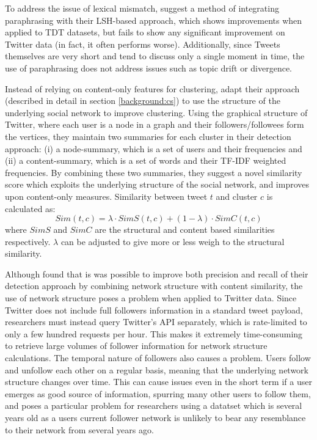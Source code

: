 To address the issue of lexical mismatch, \cite{Petrovic:2012:UPI:2382029.2382072} suggest a method of integrating paraphrasing with their LSH-based approach, which shows improvements when applied to TDT datasets, but fails to show any significant improvement on Twitter data (in fact, it often performs worse).
Additionally, since Tweets themselves are very short and tend to discuss only a single moment in time, the use of paraphrasing does not address issues such as topic drift or divergence.

Instead of relying on content-only features for clustering, \cite{Aggarwal12} adapt their approach (described in detail in section \ref{background:cs}) to use the structure of the underlying social network to improve clustering.
Using the graphical structure of Twitter, where each user is a node in a graph and their followers/followees form the vertices, they maintain two summaries
for each cluster in their detection approach: (i) a node-summary, which is a set of users and their frequencies and (ii) a content-summary, which is a set of words and their TF-IDF \citep{Salton:1988:TAA:54259.54260} weighted frequencies.
By combining these two summaries, they suggest a novel similarity score which exploits the underlying structure of the social network, and improves upon content-only measures.
Similarity between tweet $t$ and cluster $c$ is calculated as:
\begin{displaymath}
	Sim(t, c) = \lambda \cdot SimS(t, c) + (1 - \lambda) \cdot SimC(t, c)
\end{displaymath}
where $SimS$ and $SimC$ are the structural and content based similarities respectively.
$\lambda$ can be adjusted to give more or less weigh to the structural similarity.

Although \cite{Aggarwal12} found that is was possible to improve both precision and recall of their detection approach by combining network structure with content similarity, the use of network structure poses a problem when applied to Twitter data.
Since Twitter does not include full followers information in a standard tweet payload, researchers must instead query Twitter's API separately, which is rate-limited to only a few hundred requests per hour.
This makes it extremely time-consuming to retrieve large volumes of follower information for network structure calculations.
The temporal nature of followers also causes a problem.
Users follow and unfollow each other on a regular basis, meaning that the underlying network structure changes over time.
This can cause issues even in the short term if a user emerges as good source of information, spurring many other users to follow them, and poses a particular problem for researchers using a datatset which is several years old as a users current follower network is unlikely to bear any resemblance to their network from several years ago.

